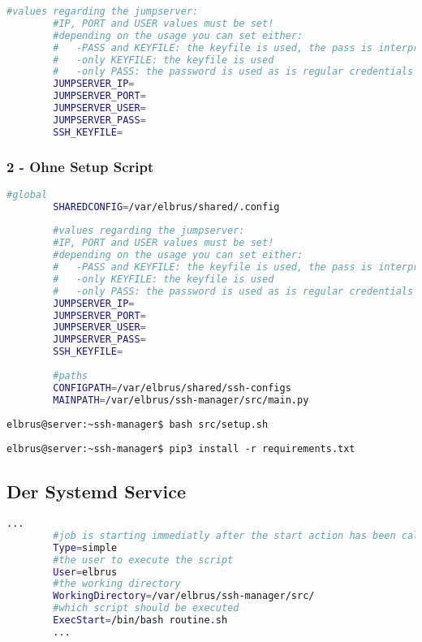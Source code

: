 \documentclass{article}
\begin{document}
	\newpage
	\lstset{style=files}
	\begin{lstlisting}[caption={Ergänzen der fehlenden Werten in '.env'.}, language=bash]
		#values regarding the jumpserver:
		#IP, PORT and USER values must be set!
		#depending on the usage you can set either:
		#   -PASS and KEYFILE: the keyfile is used, the pass is interpreted as the passphrase
		#   -only KEYFILE: the keyfile is used
		#   -only PASS: the password is used as is regular credentials
		JUMPSERVER_IP=
		JUMPSERVER_PORT=
		JUMPSERVER_USER=
		JUMPSERVER_PASS=
		SSH_KEYFILE=
	\end{lstlisting}
	
	\subsubsection{2 - Ohne Setup Script}
	\lstset{style=files}
	\begin{lstlisting}[caption={Anhand von '.env.example' eigene '.env' Datei anlegen.}, language=bash]
		#global
		SHAREDCONFIG=/var/elbrus/shared/.config
		
		#values regarding the jumpserver:
		#IP, PORT and USER values must be set!
		#depending on the usage you can set either:
		#   -PASS and KEYFILE: the keyfile is used, the pass is interpreted as the passphrase
		#   -only KEYFILE: the keyfile is used
		#   -only PASS: the password is used as is regular credentials
		JUMPSERVER_IP=
		JUMPSERVER_PORT=
		JUMPSERVER_USER=
		JUMPSERVER_PASS=
		SSH_KEYFILE=
		
		#paths
		CONFIGPATH=/var/elbrus/shared/ssh-configs
		MAINPATH=/var/elbrus/ssh-manager/src/main.py
	\end{lstlisting}

	\lstset{style=commands}	
	\begin{lstlisting}[caption={Ausführen des Scripts zur Initialisierung des VCS Verzeichnisses.}]
		elbrus@server:~ssh-manager$ bash src/setup.sh
	\end{lstlisting}

	\begin{lstlisting}[caption={Installieren von fehlenden python3 Packages.}]
		elbrus@server:~ssh-manager$ pip3 install -r requirements.txt
	\end{lstlisting}
	
	\newpage
	\subsection[systemd service]{Der Systemd Service}
	\lstset{style=files}
	\begin{lstlisting}[caption={ssh-manager.service.example - Die Variable 'WorkingDirectory' sowie die Variable 'User' anpassen.},language=bash ,keywords={WorkingDirectory, User}, keywordstyle=\color{red}, firstnumber=5]
		...
		#job is starting immediatly after the start action has been called
		Type=simple
		#the user to execute the script
		User=elbrus
		#the working directory
		WorkingDirectory=/var/elbrus/ssh-manager/src/
		#which script should be executed
		ExecStart=/bin/bash routine.sh
		...
	\end{lstlisting}
	
\end{document}
